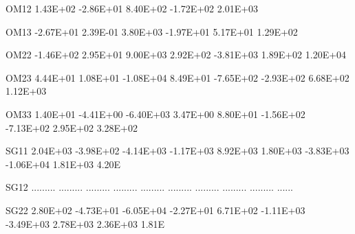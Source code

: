 \documentclass[
  11pt,
  krantz2,
  a4paper]{krantz}
\newenvironment{Shaded}{\begin{snugshade}}{\end{snugshade}}
\newcommand{\FloatTok}[1]{\textcolor[rgb]{0.00,0.00,0.81}{#1}}
\newcommand{\NormalTok}[1]{#1}
\theoremstyle{definition}
\theoremstyle{definition}
\theoremstyle{definition}
\theoremstyle{remark}
\begin{document}
\begin{Shaded}
\begin{Highlighting}[]
\NormalTok{OM12    }\FloatTok{1.43E+02} \FloatTok{{-}2.86E+01}  \FloatTok{8.40E+02} \FloatTok{{-}1.72E+02}  \FloatTok{2.01E+03}                                               
                                                                                                       
\NormalTok{OM13   }\FloatTok{{-}2.67E+01}  \FloatTok{2.39E{-}01}  \FloatTok{3.80E+03} \FloatTok{{-}1.97E+01}  \FloatTok{5.17E+01}  \FloatTok{1.29E+02}                                     
                                                                                                       
\NormalTok{OM22   }\FloatTok{{-}1.46E+02}  \FloatTok{2.95E+01}  \FloatTok{9.00E+03}  \FloatTok{2.92E+02} \FloatTok{{-}3.81E+03}  \FloatTok{1.89E+02}  \FloatTok{1.20E+04}                           
                                                                                                       
\NormalTok{OM23    }\FloatTok{4.44E+01}  \FloatTok{1.08E+01} \FloatTok{{-}1.08E+04}  \FloatTok{8.49E+01} \FloatTok{{-}7.65E+02} \FloatTok{{-}2.93E+02}  \FloatTok{6.68E+02}  \FloatTok{1.12E+03}                 
                                                                                                       
\NormalTok{OM33    }\FloatTok{1.40E+01} \FloatTok{{-}4.41E+00} \FloatTok{{-}6.40E+03}  \FloatTok{3.47E+00}  \FloatTok{8.80E+01} \FloatTok{{-}1.56E+02} \FloatTok{{-}7.13E+02}  \FloatTok{2.95E+02}  \FloatTok{3.28E+02}       
                                                                                                       
\NormalTok{SG11    }\FloatTok{2.04E+03} \FloatTok{{-}3.98E+02} \FloatTok{{-}4.14E+03} \FloatTok{{-}1.17E+03}  \FloatTok{8.92E+03}  \FloatTok{1.80E+03} \FloatTok{{-}3.83E+03} \FloatTok{{-}1.06E+04}  \FloatTok{1.81E+03}  \FloatTok{4.20}\NormalTok{E}
                                                                                                       
\NormalTok{SG12   ......... ......... ......... ......... ......... ......... ......... ......... ......... ......}
                                                                                                       
\NormalTok{SG22    }\FloatTok{2.80E+02} \FloatTok{{-}4.73E+01} \FloatTok{{-}6.05E+04} \FloatTok{{-}2.27E+01}  \FloatTok{6.71E+02} \FloatTok{{-}1.11E+03} \FloatTok{{-}3.49E+03}  \FloatTok{2.78E+03}  \FloatTok{2.36E+03}  \FloatTok{1.81}\NormalTok{E}
\end{Highlighting}
\end{Shaded}
\end{document}

